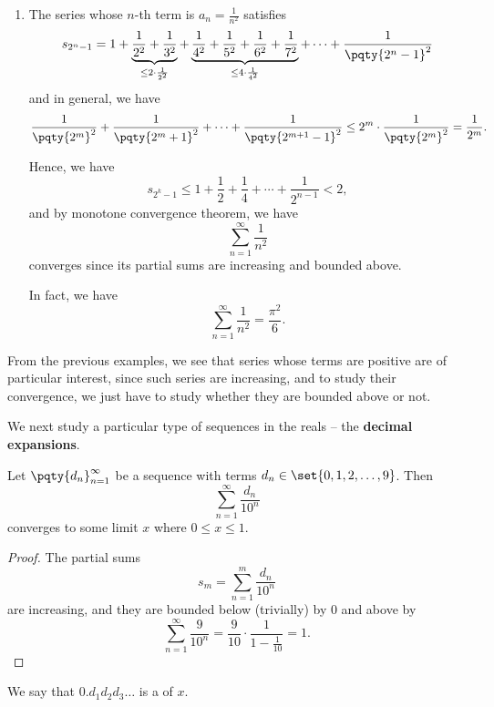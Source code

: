 \begin{examples}
\begin{enumerate}
        \item The series whose \(n\)-th term is \(a_n = \frac{1}{n^2}\) satisfies
        \[
            s_{2^n - 1} = 1 + \underbrace{\frac{1}{2^2} + \frac{1}{3^2}}_{\leq 2 \cdot \frac{1}{2^2}} + \underbrace{\frac{1}{4^2} + \frac{1}{5^2} + \frac{1}{6^2} + \frac{1}{7^2}}_{\leq 4 \cdot \frac{1}{4^2}} + \cdots + \frac{1}{\pqty{2^n - 1}^2}
        \]
        and in general, we have
        \[
            \frac{1}{\pqty{2^m}^2} + \frac{1}{\pqty{2^m + 1}^2} + \cdots + \frac{1}{\pqty{2^{m + 1} - 1}^2} \leq 2^m \cdot \frac{1}{\pqty{2^m}^2} = \frac{1}{2^m}.
        \]

        Hence, we have
        \[
            s_{2^k - 1} \leq 1 + \frac{1}{2} + \frac{1}{4} + \cdots + \frac{1}{2^{n - 1}} < 2,
        \]
        and by monotone convergence theorem, we have
        \[
            \sum_{n = 1}^{\infty} \frac{1}{n^2}
        \]
        converges since its partial sums are increasing and bounded above.

        In fact, we have
        \[
            \sum_{n = 1}^{\infty} \frac{1}{n^2} = \frac{\pi^2}{6}.
        \]
    \end{enumerate}
\end{examples}

From the previous examples, we see that series whose terms are positive are of particular interest, since such series are increasing, and to study their convergence, we just have to study whether they are bounded above or not.

We next study a particular type of sequences in the reals -- the \textbf{decimal expansions}.

\begin{proposition}
    Let \(\pqty{d_n}_{n = 1}^{\infty}\) be a sequence with terms \(d_n \in \set{0, 1, 2, \ldots, 9}\). Then
    \[
        \sum_{n = 1}^{\infty} \frac{d_n}{10^n}
    \]
    converges to some limit \(x\) where \(0 \leq x \leq 1\).
\end{proposition}

\begin{proof}
    The partial sums
    \[
        s_m = \sum_{n = 1}^{m} \frac{d_n}{10^n}
    \]
    are increasing, and they are bounded below (trivially) by \(0\) and above by
    \[
        \sum_{n = 1}^{\infty} \frac{9}{10^n} = \frac{9}{10} \cdot \frac{1}{1 - \frac{1}{10}} = 1.
    \]
\end{proof}

\begin{definition}
    We say that \(0.d_1 d_2 d_3 \ldots\) is a  of \(x\).
\end{definition}

